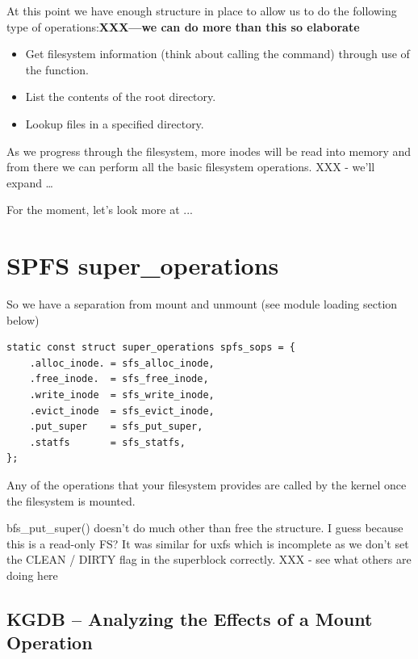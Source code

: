 At this point we have enough structure in place to allow us to do the following type of operations:\textbf{XXX---we can do more than this so elaborate}

\begin{itemize}
	\item Get filesystem information (think about calling the  command) through use of 
		 the  function.
	\item List the contents of the root directory.
	\item Lookup files in a specified directory.
\end{itemize}

\noindent
As we progress through the filesystem, more inodes will be read into memory and from there we can perform all the basic filesystem operations. XXX - we’ll expand …

For the moment, let’s look more at  ...


\section{SPFS super\_operations}

So we have a separation from mount and unmount (see module loading section below)

\begin{lstlisting}
static const struct super_operations spfs_sops = {
	.alloc_inode. = sfs_alloc_inode,
	.free_inode.  = sfs_free_inode,
	.write_inode  = sfs_write_inode,
	.evict_inode  = sfs_evict_inode,
	.put_super    = sfs_put_super,
	.statfs       = sfs_statfs,
};
\end{lstlisting}

\noindent
Any of the operations that your filesystem provides are called by the kernel once the filesystem is mounted.

bfs\_put\_super() doesn’t do much other than free the structure. I guess because this is a read-only FS? It was similar for uxfs which is incomplete as we don’t set the CLEAN / DIRTY flag in the superblock correctly. XXX - see what others are doing here


\subsection{KGDB -- Analyzing the Effects of a Mount Operation}

